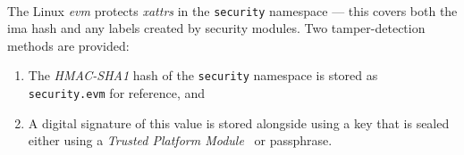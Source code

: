 \paragraph{} The Linux \textit{\acrfull{evm}} protects \textit{\acrshort{xattr}s} in the \texttt{security} namespace --- this covers both the \acrshort{ima} hash and any labels created by security modules. Two tamper-detection methods are provided:

\begin{enumerate}
    \item The \textit{HMAC-SHA1} hash of the \texttt{security} namespace is stored as \texttt{security.evm} for reference, and
    \item A digital signature of this value is stored alongside using a key that is sealed either using a \textit{Trusted Platform Module}~\cite{tpm} or passphrase.
\end{enumerate}
